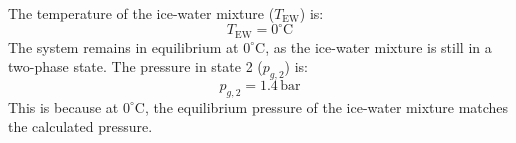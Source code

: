 The temperature of the ice-water mixture (\( T_{\text{EW}} \)) is:  
\[
T_{\text{EW}} = 0^\circ\text{C}
\]  
The system remains in equilibrium at \( 0^\circ\text{C} \), as the ice-water mixture is still in a two-phase state. The pressure in state 2 (\( p_{g,2} \)) is:  
\[
p_{g,2} = 1.4 \, \text{bar}
\]  
This is because at \( 0^\circ\text{C} \), the equilibrium pressure of the ice-water mixture matches the calculated pressure.